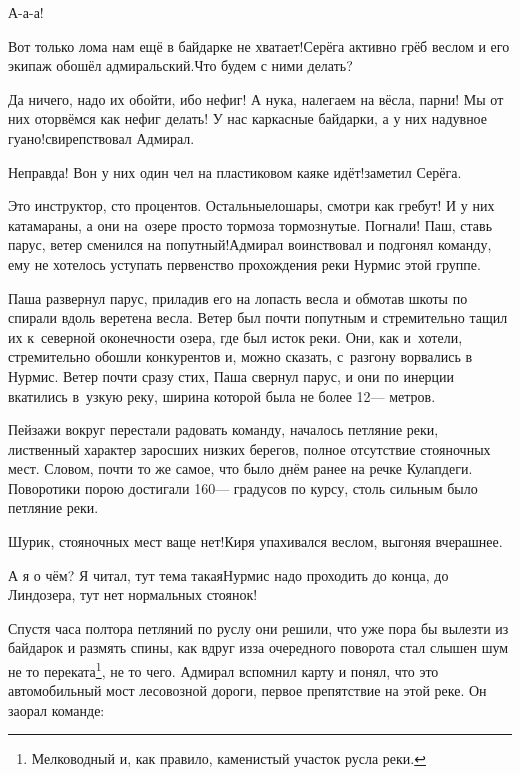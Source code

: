 \diagdash А-а-а!

\diagdash Вот только лома нам ещё в байдарке не хватает!\mdash Серёга активно грёб веслом и его экипаж обошёл адмиральский.\mdash Что будем с ними делать?

\diagdash Да ничего, надо их обойти, ибо нефиг! А ну\sdash ка, налегаем на вёсла, парни! Мы от них оторвёмся как нефиг делать! У нас каркасные байдарки, а у них надувное гуано!\mdash свирепствовал Адмирал.

\diagdash Неправда! Вон у них один чел на пластиковом каяке идёт!\mdash заметил Серёга.

\diagdash Это инструктор, сто процентов. Остальные\mdash лошары, смотри как гребут! И у них катамараны, а они на~озере просто тормоза тормознутые. Погнали! Паш, ставь парус, ветер сменился на попутный!\mdash Адмирал воинствовал и подгонял команду, ему не хотелось уступать первенство прохождения реки Нурмис этой группе.

Паша развернул парус, приладив его на лопасть весла и обмотав шкоты по спирали вдоль веретена весла. Ветер был почти попутным и стремительно тащил их к~северной оконечности озера, где был исток реки. Они, как и~хотели, стремительно обошли конкурентов и, можно сказать, с~разгону ворвались в Нурмис. Ветер почти сразу стих, Паша свернул парус, и они по инерции вкатились в~узкую реку, ширина которой была не более 12\thinspace\nobreakdash--- метров.


Пейзажи вокруг перестали радовать команду, началось петляние реки, лиственный характер заросших низких берегов, полное отсутствие стояночных мест. Словом, почти то же самое, что было днём ранее на речке Кулапдеги. Поворотики порою достигали 160\thinspace\nobreakdash--- градусов по курсу, столь сильным было петляние реки.

\diagdash Шурик, стояночных мест ваще нет!\mdash Киря упахивался веслом, выгоняя вчерашнее.

\diagdash А я о чём? Я читал, тут тема такая\mdash Нурмис надо проходить до конца, до Линдозера, тут нет нормальных стоянок!

\renewcommand*{\thefootnote}{\fnsymbol{footnote}}
\setcounter{footnote}{0}
Спустя часа полтора петляний по руслу они решили, что уже пора бы вылезти из байдарок и размять спины, как вдруг из\sdash за очередного поворота стал слышен шум не то переката\footnote{Мелководный и, как правило, каменистый участок русла реки.}, не то чего. Адмирал вспомнил карту и понял, что это автомобильный мост лесовозной дороги, первое препятствие на этой реке. Он заорал команде:

